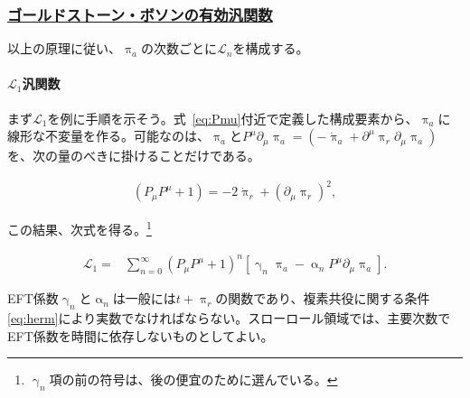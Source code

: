\documentclass[a4paper,11pt]{ltjsarticle}
\numberwithin{equation}{section}
\newcommand{\subsubsectionlink}[1]{\subsubsection[#1]{\hyperlink{toc}{#1}}}
\newcommand{\Eq}[1]{Eq.~(\ref{#1})}
\renewcommand{\Eq}[1]{式~\eqref{#1}}
\begin{document}
\subsubsectionlink{ゴールドストーン・ボソンの有効汎関数}

以上の原理に従い、$\uppi_a$の次数ごとに$\mathcal{L}_n$を構成する。

\paragraph{$\mathcal{L}_1$汎関数}

まず$\mathcal{L}_1$を例に手順を示そう。\Eq{eq:Pmu}付近で定義した構成要素から、$\uppi_a$に線形な不変量を作る。可能なのは、$\uppi_a$と$P^\mu\partial_\mu\uppi_a=(-\dot{\uppi}_a+\partial^\mu\uppi_r\partial_\mu\uppi_a)$を、次の量のべきに掛けることだけである。

\begin{align}
        \left( P_\mu P^\mu  +1\right) = -2 \dot{\uppi}_{r} + \left( \partial_\mu \uppi_{r}\right)^2,
    \end{align}

この結果、次式を得る\cite{Hongo:2018ant}。\footnote{$\upgamma_n$項の前の符号は、後の便宜のために選んでいる。}

\begin{align}
        \mathcal{L}_1 = & \sum_{n=0}^\infty \left( P_\mu P^\mu  +1\right)^{n} \left[ \upgamma_n \uppi_{a} -\upalpha_n P^\mu \partial_\mu \uppi_{a}  \right].
    \end{align}

EFT係数$\upgamma_n$と$\upalpha_n$は一般には$t+\uppi_r$の関数であり、複素共役に関する条件\eqref{eq:herm}により実数でなければならない。スローロール領域では、主要次数でEFT係数を時間に依存しないものとしてよい\cite{Hongo:2018ant}。
\end{document}

